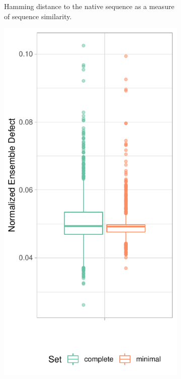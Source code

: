 \documentclass[../../master.tex]{subfiles}
\begin{document}
\begin{figure}[!ht]
\begin{subfigure}[t]{0.2\textwidth}
		\caption{Hamming distance to the native sequence as a measure of sequence similarity.
		}\label{fig:stats_constrained:a}
	\end{subfigure}%
	\begin{subfigure}[t]{0.2\textwidth}
		\centering
		\includegraphics[width=\textwidth]{pic/results/designs/boxplots/const-score-boxplot.pdf}

\end{subfigure}
\end{figure}
\end{document}
